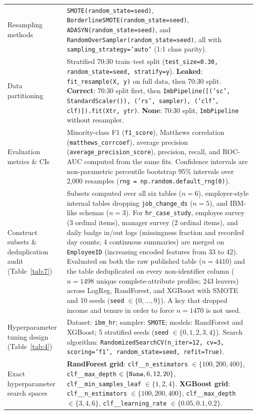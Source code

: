 \documentclass[12pt,a4paper]{article}
\begin{document}
\begin{longtable}{@{}>{\raggedright\arraybackslash}p{}>{\raggedright\arraybackslash}p{}@{}}
Resampling methods & \texttt{SMOTE(random\_state=seed)}, \texttt{BorderlineSMOTE(random\_state=seed)}, \texttt{ADASYN(random\_state=seed)}, and \texttt{RandomOverSampler(random\_state=seed)}, all with \texttt{sampling\_strategy='auto'} (1:1 class parity). \\
Data partitioning & Stratified 70:30 train--test split (\texttt{test\_size=0.30, random\_state=seed, stratify=y}). \textbf{Leaked}: \texttt{fit\_resample(X, y)} on full data, then 70:30 split. \textbf{Correct}: 70:30 split first, then \texttt{ImbPipeline([('sc', StandardScaler()), ('rs', sampler), ('clf', clf)]).fit(Xtr, ytr)}. \textbf{None}: 70:30 split, \texttt{ImbPipeline} without resampler. \\
Evaluation metrics \& CIs & Minority-class F1 (\texttt{f1\_score}), Matthews correlation (\texttt{matthews\_corrcoef}), average precision (\texttt{average\_precision\_score}), precision, recall, and ROC-AUC computed from the same fits. Confidence intervals are non-parametric percentile bootstrap 95\% intervals over 2,000 resamples (\texttt{rng = np.random.default\_rng(0)}). \\
Construct subsets \& deduplication audit (Table~\ref{tab:7}) & Subsets computed over all six tables ($n=6$), employer-style internal tables dropping \texttt{job\_change\_ds} ($n=5$), and IBM-like schemas ($n=3$). For \texttt{hr\_case\_study}, employee survey (3 ordinal items), manager survey (2 ordinal items), and daily badge in/out logs (missingness fraction and recorded day counts; 4 continuous summaries) are merged on \texttt{EmployeeID} (increasing encoded features from 33 to 42). Evaluated on both the raw published table ($n=4410$) and the table deduplicated on every non-identifier column ($n=1498$ unique complete-attribute profiles; 243 leavers) across LogReg, RandForest, and XGBoost with SMOTE and 10 seeds (\texttt{seed} $\in \{0,\dots,9\}$). A key that dropped income and tenure in order to force $n=1470$ is not used. \\
Hyperparameter tuning design (Table~\ref{tab:4}) & Dataset: \texttt{ibm\_hr}; sampler: \texttt{SMOTE}; models: RandForest and XGBoost; 5 stratified seeds (\texttt{seed} $\in \{0,1,2,3,4\}$). Search algorithm: \texttt{RandomizedSearchCV(n\_iter=12, cv=3, scoring='f1', random\_state=seed, refit=True)}. \\
Exact hyperparameter search spaces & \textbf{RandForest grid}: \texttt{clf\_\_n\_estimators} $\in \{100, 200, 400\}$, \texttt{clf\_\_max\_depth} $\in \{\text{\texttt{None}}, 6, 12, 20\}$, \texttt{clf\_\_min\_samples\_leaf} $\in \{1, 2, 4\}$. \newline \textbf{XGBoost grid}: \texttt{clf\_\_n\_estimators} $\in \{100, 200, 400\}$, \texttt{clf\_\_max\_depth} $\in \{3, 4, 6\}$, \texttt{clf\_\_learning\_rate} $\in \{0.05, 0.1, 0.2\}$. \\

\end{longtable}
\end{document}
